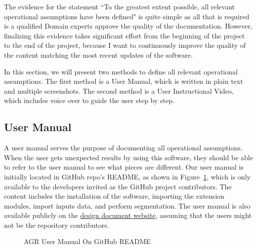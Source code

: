The evidence for the statement ``To the greatest extent possible, all relevant operational assumptions have been defined" is quite simple as all that is required is a qualified Domain experts approve the quality of the documentation. However, finalizing this evidence takes significant effort from the beginning of the project to the end of the project, because I want to continuously improve the quality of the content matching the most recent updates of the software.

In this section, we will present two methods to define all relevant operational assumptions. The first method is a User Manual, which is written in plain text and multiple screenshots. The second method is a User Instructional Video, which includes voice over to guide the user step by step.

\subsection{User Manual}
A user manual serves the purpose of documenting all operational assumptions. When the user gets unexpected results by using this software, they should be able to refer to the user manual to see what pieces are different. Our user manual is initially located in GitHub repo's README, as shown in Figure~\ref{fig_agr_git_um}, which is only available to the developers invited as the GitHub project contributors. The content includes the installation of the software, importing the extension modules, import inputs data, and perform segmentation. The user manual is also available publicly on the \href{https://joviel25.github.io/AortaGR-design-document/UserInstructions.html}{design document website}, assuming that the users might not be the repository contributors.

\begin{figure}[H]
    \centering
    \caption[AGR User Manual On GitHub README]{AGR User Manual On GitHub README}
    \label{fig_agr_git_um}
\end{figure}


